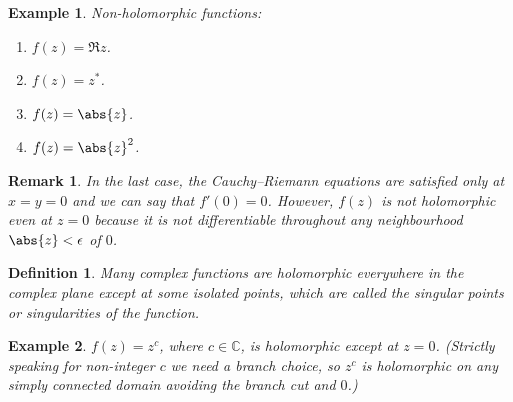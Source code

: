 \documentclass{article}
\theoremstyle{plain}\theoremheaderfont{\normalfont\itshape}\theorembodyfont{\rmfamily}\theoremseparator{.}\newtheorem*{rem}{Remark}\newtheorem*{ex}{Example}\newtheorem*{proof}{Proof}\newtheorem*{altp}{Alternative proof}
\theoremstyle{plain}\theoremheaderfont{\normalfont\bfseries}\theorembodyfont{\rmfamily}\theoremseparator{.}\newtheorem{thm}{Theorem}[section]\newtheorem{lem}[thm]{Lemma}\newtheorem{prop}[thm]{Proposition}\newtheorem*{cor}{Corollary}\newtheorem{defn}[thm]{Definition}\newtheorem{clm}[thm]{Claim}\newtheorem{clminproof}{Claim}
\theoremstyle{break}\theoremheaderfont{\normalfont\itshape}\theorembodyfont{\rmfamily}\theoremseparator{.\medskip}\newtheorem*{proofskip}{Proof}\newtheorem*{exs}{Examples}\newtheorem*{rems}{Remarks}
\theoremstyle{break}\theoremheaderfont{\normalfont\bfseries}\theorembodyfont{\rmfamily}\theoremseparator{.\medskip}\newtheorem{lemskip}[thm]{Lemma}\newtheorem{defnskip}[thm]{Definition}\newtheorem{propskip}[thm]{Proposition}\newtheorem{thmskip}[thm]{Theorem}
\numberwithin{equation}{section}
\begin{document}
	\begin{ex}
		Non-holomorphic functions:
		\begin{enumerate}[topsep=0pt]
			\item[(i)] \(f(z)=\Re z\).
			\item[(ii)] \(f(z)=z^*\).
			\item[(iii)] \(f(z)=\abs{z}\).
			\item[(iv)] \(f(z)=\abs{z}^2\).
		\end{enumerate}
	\end{ex}
	\begin{rem}
		In the last case, the Cauchy--Riemann equations are satisfied only at \(x=y=0\) and we can say that \(f'(0)=0\). However, \(f(z)\) is not holomorphic even at \(z=0\) because it is not differentiable throughout any neighbourhood \(\abs{z}<\epsilon\) of \(0\).
	\end{rem}
	\begin{defn}
		Many complex functions are holomorphic everywhere in the complex plane except at some isolated points, which are called the \textit{singular points} or \textit{singularities} of the function.
	\end{defn}
	\begin{ex}
		\(f(z)=z^c\), where \(c\in\mathbb{C}\), is holomorphic except at \(z=0\). (Strictly speaking for non-integer \(c\) we need a branch choice, so \(z^c\) is holomorphic on any simply connected domain avoiding the branch cut and \(0\).)
	\end{ex}
\end{document}
